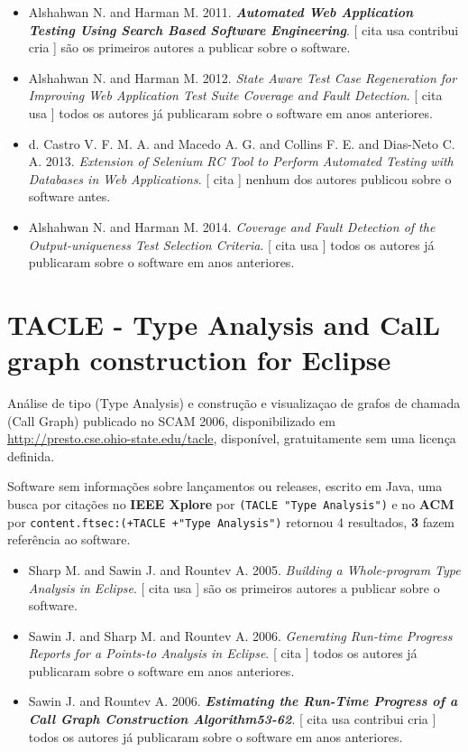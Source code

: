 \begin{itemize}
\item Alshahwan N. and Harman M.
      2011.
        \textbf{\textit{ Automated Web Application Testing Using Search Based Software Engineering}}.
      [
          cita
          usa
          contribui
          cria
      ]
são os primeiros autores a publicar sobre o software.
\item Alshahwan N. and Harman M.
      2012.
        \textit{ State Aware Test Case Regeneration for Improving Web Application Test Suite Coverage and Fault Detection}.
      [
          cita
          usa
      ]
todos os autores já publicaram sobre o software em anos anteriores.
\item d. Castro V. F. M. A. and Macedo A. G. and Collins F. E. and Dias-Neto C. A.
      2013.
        \textit{ Extension of Selenium RC Tool to Perform Automated Testing with Databases in Web Applications}.
      [
          cita
      ]
nenhum dos autores publicou sobre o software antes.
\item Alshahwan N. and Harman M.
      2014.
        \textit{ Coverage and Fault Detection of the Output-uniqueness Test Selection Criteria}.
      [
          cita
          usa
      ]
todos os autores já publicaram sobre o software em anos anteriores.
\end{itemize}
\section{TACLE - Type Analysis and CalL graph construction for Eclipse}

Análise de tipo (Type Analysis) e construção e visualizaçao de grafos de chamada (Call Graph)
publicado no SCAM 2006,
disponibilizado em \url{http://presto.cse.ohio-state.edu/tacle},
disponível,
gratuitamente
sem uma licença definida.

Software sem informações sobre lançamentos ou releases,
escrito em Java,
uma busca por citações no {\bf IEEE Xplore} por
\texttt{(TACLE "Type Analysis")}
e no {\bf ACM} por
\texttt{content.ftsec:(+TACLE +"Type Analysis")}
retornou
4 resultados,
{\bf 3} fazem referência ao software.

\begin{itemize}
\item Sharp M. and Sawin J. and Rountev A.
      2005.
        \textit{ Building a Whole-program Type Analysis in Eclipse}.
      [
          cita
          usa
      ]
são os primeiros autores a publicar sobre o software.
\item Sawin J. and Sharp M. and Rountev A.
      2006.
        \textit{ Generating Run-time Progress Reports for a Points-to Analysis in Eclipse}.
      [
          cita
      ]
todos os autores já publicaram sobre o software em anos anteriores.
\item Sawin J. and Rountev A.
      2006.
        \textbf{\textit{ Estimating the Run-Time Progress of a Call Graph Construction Algorithm53-62}}.
      [
          cita
          usa
          contribui
          cria
      ]
todos os autores já publicaram sobre o software em anos anteriores.
\end{itemize}
